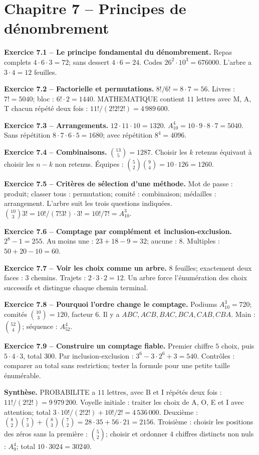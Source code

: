 \documentclass[11pt,a4paper,openany]{book}
\begin{document}
\chapter*{Chapitre 7 -- Principes de dénombrement}
\begin{answerbox}
\textbf{Exercice 7.1 -- Le principe fondamental du dénombrement.} Repas complets $4\cdot6\cdot3=72$; sans dessert $4\cdot6=24$. Codes $26^2\cdot10^3=676000$. L'arbre a $3\cdot4=12$ feuilles.\par
\textbf{Exercice 7.2 -- Factorielle et permutations.} $8!/6!=8\cdot7=56$. Livres : $7!=5040$; bloc : $6!\cdot2=1440$. MATHEMATIQUE contient $11$ lettres avec M, A, T chacun répété deux fois : $11!/(2!2!2!)=4\,989\,600$.\par
\textbf{Exercice 7.3 -- Arrangements.} $12\cdot11\cdot10=1320$. $A_{10}^4=10\cdot9\cdot8\cdot7=5040$. Sans répétition $8\cdot7\cdot6\cdot5=1680$; avec répétition $8^4=4096$.\par
\textbf{Exercice 7.4 -- Combinaisons.} $\binom{13}{5}=1287$. Choisir les $k$ retenus équivaut à choisir les $n-k$ non retenus. Équipes : $\binom52\binom94=10\cdot126=1260$.\par
\textbf{Exercice 7.5 -- Critères de sélection d'une méthode.} Mot de passe : produit; classer tous : permutation; comité : combinaison; médailles : arrangement. L'arbre suit les trois questions indiquées. $\binom{10}{3}3!=10!/(7!3!)\cdot3!=10!/7!=A_{10}^3$.\par
\textbf{Exercice 7.6 -- Comptage par complément et inclusion-exclusion.} $2^8-1=255$. Au moins une : $23+18-9=32$; aucune : $8$. Multiples : $50+20-10=60$.\par
\textbf{Exercice 7.7 -- Voir les choix comme un arbre.} $8$ feuilles; exactement deux faces : $3$ chemins. Trajets : $2\cdot3\cdot2=12$. Un arbre force l'énumération des choix successifs et distingue chaque chemin terminal.\par
\textbf{Exercice 7.8 -- Pourquoi l'ordre change le comptage.} Podiums $A_{10}^3=720$; comités $\binom{10}{3}=120$, facteur $6$. Il y a $ABC,ACB,BAC,BCA,CAB,CBA$. Main : $\binom{52}{4}$; séquence : $A_{52}^4$.\par
\textbf{Exercice 7.9 -- Construire un comptage fiable.} Premier chiffre $5$ choix, puis $5\cdot4\cdot3$, total $300$. Par inclusion-exclusion : $3^6-3\cdot2^6+3=540$. Contrôles : comparer au total sans restriction; tester la formule pour une petite taille énumérable.\par
\medskip\textbf{Synthèse.} PROBABILITE a $11$ lettres, avec B et I répétés deux fois : $11!/(2!2!)=9\,979\,200$. Voyelle initiale : traiter les choix de A, O, E et I avec attention; total $3\cdot10!/(2!2!)+10!/2!=4\,536\,000$. Deuxième : $\binom82\binom73+\binom83\binom72=28\cdot35+56\cdot21=2156$. Troisième : choisir les positions des zéros sans la première : $\binom52$; choisir et ordonner $4$ chiffres distincts non nuls : $A_9^4$; total $10\cdot3024=30240$.
\end{answerbox}
\end{document}
